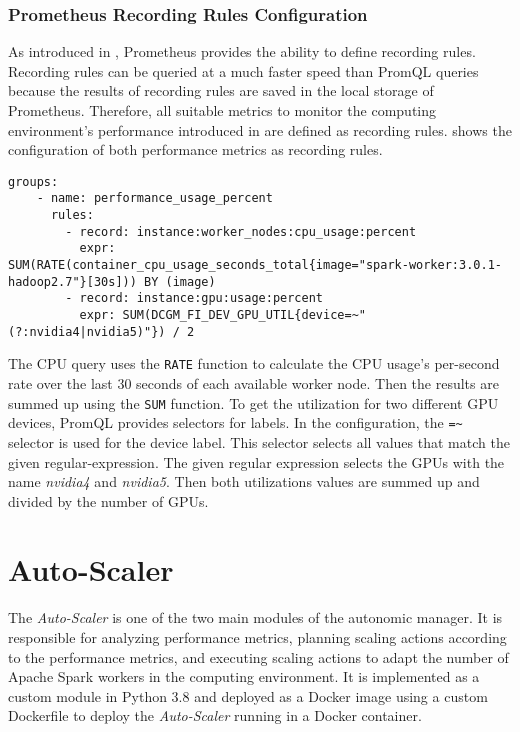 \subsubsection{Prometheus Recording Rules Configuration}
%
As introduced in , Prometheus provides the ability to define recording rules. Recording rules can be queried at a much faster speed than PromQL queries because the results of recording rules are saved in the local storage of Prometheus.
%
Therefore, all suitable metrics to monitor the computing environment's performance introduced in  are defined as recording rules.
%
 shows the configuration of both performance metrics as recording rules.
%
\begin{lstlisting}[label=lst:06_env_depl_am_prom-rules, caption=Prometheus target configuration in YAML syntax]
groups:
    - name: performance_usage_percent
      rules:
        - record: instance:worker_nodes:cpu_usage:percent
          expr: SUM(RATE(container_cpu_usage_seconds_total{image="spark-worker:3.0.1-hadoop2.7"}[30s])) BY (image)
        - record: instance:gpu:usage:percent
          expr: SUM(DCGM_FI_DEV_GPU_UTIL{device=~"(?:nvidia4|nvidia5)"}) / 2
\end{lstlisting}
The CPU query uses the \texttt{RATE} function to calculate the CPU usage's per-second rate over the last 30 seconds of each available worker node. Then the results are summed up using the \texttt{SUM} function.
To get the utilization for two different GPU devices, PromQL provides selectors for labels. In the configuration, the \texttt{=\~} selector is used for the device label. This selector selects all values that match the given regular-expression. The given regular expression selects the GPUs with the name \textit{nvidia4} and \textit{nvidia5}. Then both utilizations values are summed up and divided by the number of GPUs.


\section{Auto-Scaler}
The \textit{Auto-Scaler} is one of the two main modules of the autonomic manager. It is responsible for analyzing performance metrics, planning scaling actions according to the performance metrics, and executing scaling actions to adapt the number of Apache Spark workers in the computing environment.
It is implemented as a custom module in Python 3.8 and deployed as a Docker image using a custom Dockerfile to deploy the \textit{Auto-Scaler} running in a Docker container.


